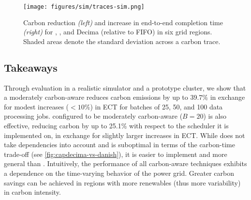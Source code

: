 \begin{figure}[t]
    \centering 
    \vspace{-0.5em}
    \texttt{[image: figures/sim/traces-sim.png]} \vspace{-0.4cm}
    \caption{ Carbon reduction \textit{(left)} and increase in end-to-end completion time \textit{(right)} for \CAP, \DANISH, and Decima (relative to FIFO) in six grid regions.  Shaded areas denote the standard deviation across a carbon trace. }
    \label{fig:traces-sim} 
    \vspace{-0.4cm}
\end{figure}






\subsection{Takeaways}
Through evaluation in a realistic simulator and a prototype cluster, we show that a moderately carbon-aware \DANISH reduces carbon emissions by up to 39.7\% in exchange for modest increases ($< 10\%$) in ECT for batches of 25, 50, and 100 data processing jobs.  
\CAP configured to be moderately carbon-aware ($B=20$) is also effective, reducing carbon by up to 25.1\% with respect to the scheduler it is implemented on, in exchange for slightly larger increases in ECT.  While \CAP does not take dependencies into account and is suboptimal in terms of the carbon-time trade-off (see \autoref{fig:capdecima-vs-danish}), it is easier to implement and more general than \DANISH.
Intuitively, the performance of all carbon-aware techniques exhibits a dependence on the time-varying behavior of the power grid.
Greater carbon savings can be achieved in regions with more renewables (thus more variability) in carbon intensity.
